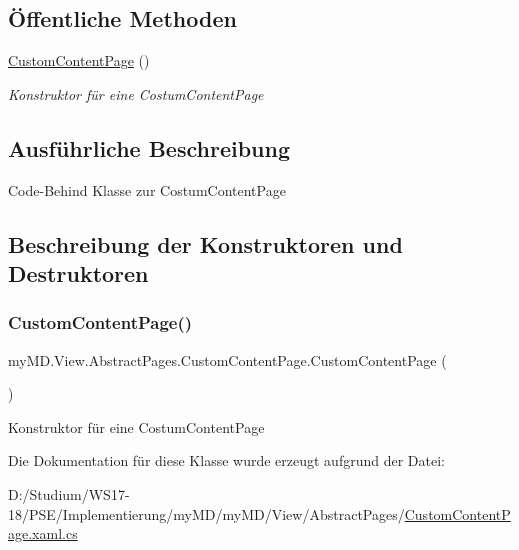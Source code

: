 \subsection*{Öffentliche Methoden}
\begin{DoxyCompactItemize}
\item 
\mbox{\hyperlink{classmy_m_d_1_1_view_1_1_abstract_pages_1_1_custom_content_page_a3cb9c69e49e16c30e2e5377790702769}{Custom\+Content\+Page}} ()
\begin{DoxyCompactList}\small\item\em Konstruktor für eine Costum\+Content\+Page \end{DoxyCompactList}\end{DoxyCompactItemize}


\subsection{Ausführliche Beschreibung}
Code-\/\+Behind Klasse zur Costum\+Content\+Page 



\subsection{Beschreibung der Konstruktoren und Destruktoren}
\mbox{\label{classmy_m_d_1_1_view_1_1_abstract_pages_1_1_custom_content_page_a3cb9c69e49e16c30e2e5377790702769}} 
\subsubsection{\texorpdfstring{Custom\+Content\+Page()}{CustomContentPage()}}
{\footnotesize\ttfamily my\+M\+D.\+View.\+Abstract\+Pages.\+Custom\+Content\+Page.\+Custom\+Content\+Page (\begin{DoxyParamCaption}{ }\end{DoxyParamCaption})}



Konstruktor für eine Costum\+Content\+Page 



Die Dokumentation für diese Klasse wurde erzeugt aufgrund der Datei\+:\begin{DoxyCompactItemize}
\item 
D\+:/\+Studium/\+W\+S17-\/18/\+P\+S\+E/\+Implementierung/my\+M\+D/my\+M\+D/\+View/\+Abstract\+Pages/\mbox{\hyperlink{_custom_content_page_8xaml_8cs}{Custom\+Content\+Page.\+xaml.\+cs}}\end{DoxyCompactItemize}

